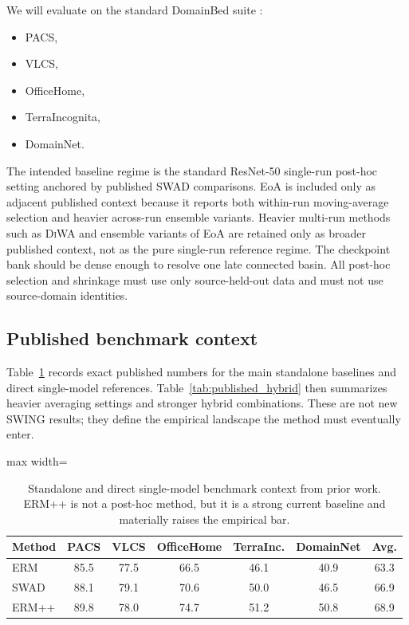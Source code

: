 \documentclass{article}
\newcommand{\swing}{\textup{\textsc{SWING}}}
\newcommand{\swad}{\textup{\textsc{SWAD}}}
\newcommand{\diwa}{\textup{\textsc{DiWA}}}
\newcommand{\erm}{\textup{\textsc{ERM}}}
\begin{document}
We will evaluate on the standard DomainBed suite \citep{gulrajani2021domainbed}:
\begin{itemize}[leftmargin=1.4em]
    \item PACS,
    \item VLCS,
    \item OfficeHome,
    \item TerraIncognita,
    \item DomainNet.
\end{itemize}
The intended baseline regime is the standard ResNet-50 single-run post-hoc setting anchored by published \swad{} comparisons. EoA is included only as adjacent published context because it reports both within-run moving-average selection and heavier across-run ensemble variants. Heavier multi-run methods such as \diwa{} and ensemble variants of EoA are retained only as broader published context, not as the pure single-run reference regime. The checkpoint bank should be dense enough to resolve one late connected basin. All post-hoc selection and shrinkage must use only source-held-out data and must not use source-domain identities.

\subsection{Published benchmark context}

Table~\ref{tab:published} records exact published numbers for the main standalone baselines and direct single-model references. Table~\ref{tab:published_hybrid} then summarizes heavier averaging settings and stronger hybrid combinations. These are not new \swing{} results; they define the empirical landscape the method must eventually enter.

\begin{table}[t]
    \centering
    \small
    \begin{adjustbox}{max width=\linewidth}
    \begin{tabular}{lcccccc}
        \toprule
        Method & PACS & VLCS & OfficeHome & TerraInc. & DomainNet & Avg. \\
        \midrule
        \erm{} \citep{cha2021swad} & 85.5 & 77.5 & 66.5 & 46.1 & 40.9 & 63.3 \\
        \swad{} \citep{cha2021swad} & 88.1 & 79.1 & 70.6 & 50.0 & 46.5 & 66.9 \\
        \textsc{ERM++} \citep{teterwak2025ermpp} & 89.8 & 78.0 & 74.7 & 51.2 & 50.8 & 68.9 \\
        \bottomrule
    \end{tabular}
    \end{adjustbox}
    \caption{Standalone and direct single-model benchmark context from prior work. \textsc{ERM++} is not a post-hoc method, but it is a strong current baseline and materially raises the empirical bar.}
    \label{tab:published}
\end{table}
\end{document}
